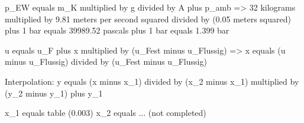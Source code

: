 p_EW equals m_K multiplied by g divided by A plus p_amb  
=> 32 kilograms multiplied by 9.81 meters per second squared divided by (0.05 meters squared) plus 1 bar equals 39989.52 pascals plus 1 bar equals 1.399 bar  

u equals u_F plus x multiplied by (u_Fest minus u_Flussig)  
=> x equals (u minus u_Flussig) divided by (u_Fest minus u_Flussig)  

Interpolation:  
y equals (x minus x_1) divided by (x_2 minus x_1) multiplied by (y_2 minus y_1) plus y_1  

x_1 equals table (0.003)  
x_2 equals ... (not completed)